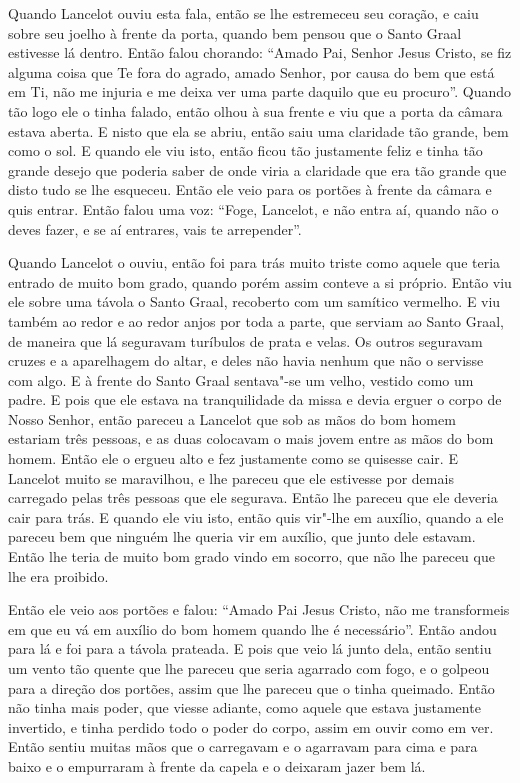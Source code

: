  Quando Lancelot ouviu esta fala, então se lhe estremeceu seu coração, e caiu
sobre seu joelho à frente da porta, quando bem pensou que o Santo Graal
estivesse lá dentro. Então falou chorando: “Amado Pai, Senhor Jesus Cristo, se
fiz alguma coisa que Te fora do agrado, amado Senhor, por causa do bem que está
em Ti, não me injuria e me deixa ver uma parte daquilo que eu procuro”. Quando
tão logo ele o tinha falado, então olhou à sua frente e viu que a porta da
câmara estava aberta. E nisto que ela se abriu, então saiu uma claridade tão
grande, bem como o sol. E quando ele viu isto, então ficou tão justamente feliz
e tinha tão grande desejo que poderia saber de onde viria a claridade que era
tão grande que disto tudo se lhe esqueceu. Então ele veio para os portões à
frente da câmara e quis entrar. Então falou uma voz: “Foge, Lancelot, e não
entra aí, quando não o deves fazer, e se aí entrares, vais te arrepender”. 

Quando Lancelot o ouviu, então foi para trás muito triste como aquele que teria
entrado de muito bom grado, quando porém assim conteve a si próprio. Então viu
ele sobre uma távola o Santo Graal, recoberto com um samítico vermelho. E viu
também ao redor e ao redor anjos por toda a parte, que serviam ao Santo Graal,
de maneira que lá seguravam turíbulos de prata e velas. Os outros seguravam
cruzes e a aparelhagem do altar, e deles não havia nenhum que não o servisse
com algo. E à frente do Santo Graal sentava"-se um velho, vestido como um padre.
E pois que ele estava na tranquilidade da missa e devia erguer o corpo de Nosso
Senhor, então pareceu a Lancelot que sob as mãos do bom homem estariam três
pessoas, e as duas colocavam o mais jovem entre as mãos do bom homem. Então ele
o ergueu alto e fez justamente como se quisesse cair. E Lancelot muito se
maravilhou, e lhe pareceu que ele estivesse por demais carregado pelas três
pessoas que ele segurava. Então lhe pareceu que ele deveria cair para trás. E
quando ele viu isto, então quis vir"-lhe em auxílio, quando a ele pareceu bem
que ninguém lhe queria vir em auxílio, que junto dele estavam. Então lhe teria
de muito bom grado vindo em socorro, que não lhe pareceu que lhe era proibido. 

Então ele veio aos portões e falou: “Amado Pai Jesus Cristo, não me transformeis
em que eu vá em auxílio do bom homem quando lhe é necessário”. Então andou para
lá e foi para a távola prateada. E pois que veio lá junto dela, então sentiu um
vento tão quente que lhe pareceu que seria agarrado com fogo, e o golpeou para
a direção dos portões, assim que lhe pareceu que o tinha queimado. Então não 
tinha mais poder, que viesse adiante, como aquele que estava
justamente invertido, e tinha perdido todo o poder do corpo, assim em ouvir
como em ver. Então sentiu muitas mãos que o carregavam e o agarravam para cima
e para baixo e o empurraram à frente da capela e o deixaram jazer bem lá. 

